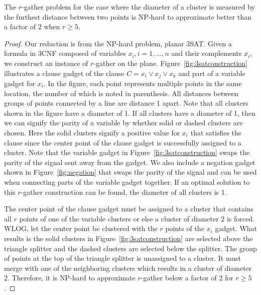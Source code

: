 \begin{theorem}\label{thm:hardness1}
The $r$-gather problem for the case where the diameter of a cluster is measured by the furthest distance between two points is NP-hard to approximate better than a factor of $2$ when $r\geq5$.
\end{theorem}
\begin{proof}
Our reduction is from the NP-hard problem, planar 3SAT.  Given a formula in 3CNF composed of variables $x_i, i = 1,\dots,n$ and their complements $\overline{x_i}$, we construct an instance of $r$-gather on the plane.  Figure~\ref{fig:3satconstruction} illustrates a clause gadget of the clause $C = x_i \vee x_j \vee x_k$ and part of a variable gadget for $x_i$.  In the figure, each point represents multiple points in the same location, the number of which is noted in parenthesis.  All distances between groups of points connected by a line are distance 1 apart.  Note that all clusters shown in the figure have a diameter of 1.  If all clusters have a diameter of 1, then we can signify the parity of a variable by whether solid or dashed clusters are chosen.  Here the solid clusters signify a positive value for $x_i$ that satisfies the clause since the center point of the clause gadget is successfully assigned to a cluster.  Note that the variable gadget in Figure~\ref{fig:3satconstruction} swaps the parity of the signal sent away from the gadget.  We also include a negation gadget shown in Figure~\ref{fig:negation} that swaps the parity of the signal and can be used when connecting parts of the variable gadget together.  If an optimal solution to this $r$-gather construction can be found, the diameter of all clusters is 1.


The center point of the clause gadget must be assigned to a cluster that contains all $r$ points of one of the variable clusters or else a cluster of diameter 2 is forced.  WLOG, let the center point be clustered with the $r$ points of the $x_i$ gadget.  What results is the solid clusters in Figure~\ref{fig:3satconstruction} are selected above the triangle splitter and the dashed clusters are selected below the splitter.  The group of points at the top of the triangle splitter is unassigned to a cluster.  It must merge with one of the neighboring clusters which results in a cluster of diameter 2.  Therefore, it is NP-hard to approximate $r$-gather below a factor of 2 for $r\geq5$.
\end{proof}

